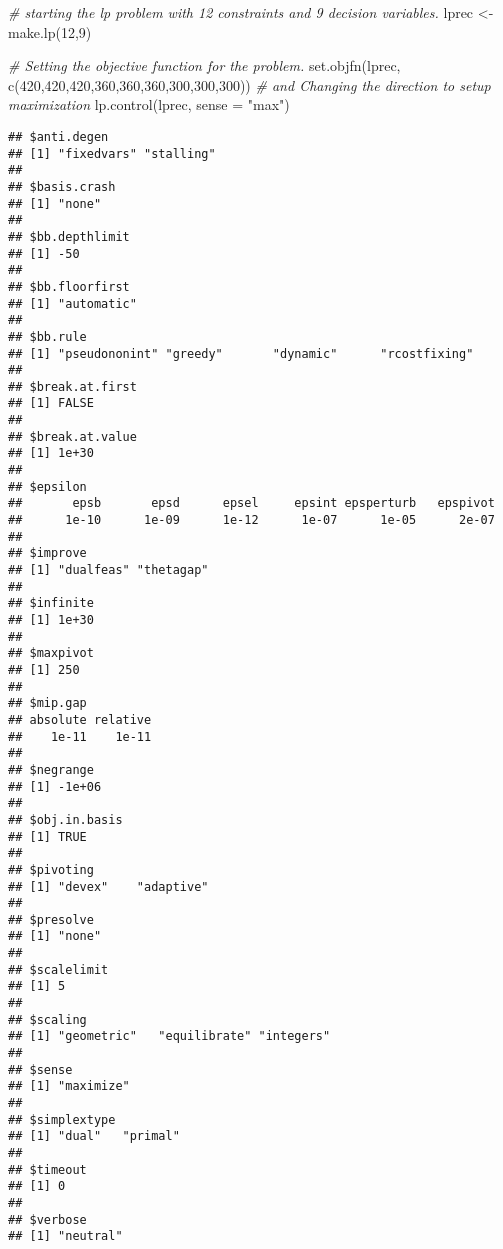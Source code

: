 \documentclass[
]{article}
\newenvironment{Shaded}{\begin{snugshade}}{\end{snugshade}}
\newcommand{\AttributeTok}[1]{\textcolor[rgb]{0.77,0.63,0.00}{#1}}
\newcommand{\CommentTok}[1]{\textcolor[rgb]{0.56,0.35,0.01}{\textit{#1}}}
\newcommand{\DecValTok}[1]{\textcolor[rgb]{0.00,0.00,0.81}{#1}}
\newcommand{\FunctionTok}[1]{\textcolor[rgb]{0.00,0.00,0.00}{#1}}
\newcommand{\NormalTok}[1]{#1}
\newcommand{\OtherTok}[1]{\textcolor[rgb]{0.56,0.35,0.01}{#1}}
\newcommand{\StringTok}[1]{\textcolor[rgb]{0.31,0.60,0.02}{#1}}
\begin{document}
\begin{Shaded}
\begin{Highlighting}[]
\CommentTok{\# starting the lp problem with 12 constraints and 9 decision variables.}
\NormalTok{lprec }\OtherTok{\textless{}{-}} \FunctionTok{make.lp}\NormalTok{(}\DecValTok{12}\NormalTok{,}\DecValTok{9}\NormalTok{)}
\end{Highlighting}
\end{Shaded}

\begin{Shaded}
\begin{Highlighting}[]
\CommentTok{\# Setting the objective function for the problem.}
\FunctionTok{set.objfn}\NormalTok{(lprec, }\FunctionTok{c}\NormalTok{(}\DecValTok{420}\NormalTok{,}\DecValTok{420}\NormalTok{,}\DecValTok{420}\NormalTok{,}\DecValTok{360}\NormalTok{,}\DecValTok{360}\NormalTok{,}\DecValTok{360}\NormalTok{,}\DecValTok{300}\NormalTok{,}\DecValTok{300}\NormalTok{,}\DecValTok{300}\NormalTok{))}
\CommentTok{\# and Changing the direction to setup maximization}
\FunctionTok{lp.control}\NormalTok{(lprec, }\AttributeTok{sense =} \StringTok{"max"}\NormalTok{)}
\end{Highlighting}
\end{Shaded}

\begin{verbatim}
## $anti.degen
## [1] "fixedvars" "stalling" 
## 
## $basis.crash
## [1] "none"
## 
## $bb.depthlimit
## [1] -50
## 
## $bb.floorfirst
## [1] "automatic"
## 
## $bb.rule
## [1] "pseudononint" "greedy"       "dynamic"      "rcostfixing" 
## 
## $break.at.first
## [1] FALSE
## 
## $break.at.value
## [1] 1e+30
## 
## $epsilon
##       epsb       epsd      epsel     epsint epsperturb   epspivot 
##      1e-10      1e-09      1e-12      1e-07      1e-05      2e-07 
## 
## $improve
## [1] "dualfeas" "thetagap"
## 
## $infinite
## [1] 1e+30
## 
## $maxpivot
## [1] 250
## 
## $mip.gap
## absolute relative 
##    1e-11    1e-11 
## 
## $negrange
## [1] -1e+06
## 
## $obj.in.basis
## [1] TRUE
## 
## $pivoting
## [1] "devex"    "adaptive"
## 
## $presolve
## [1] "none"
## 
## $scalelimit
## [1] 5
## 
## $scaling
## [1] "geometric"   "equilibrate" "integers"   
## 
## $sense
## [1] "maximize"
## 
## $simplextype
## [1] "dual"   "primal"
## 
## $timeout
## [1] 0
## 
## $verbose
## [1] "neutral"
\end{verbatim}
\end{document}
